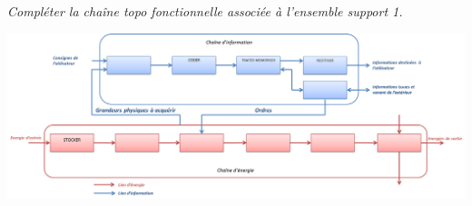 \documentclass[10pt]{article}
\begin{document}
\subparagraph{}
\textit{Compléter la chaîne topo fonctionnelle associée à l’ensemble support 1.}

\ifprof
\begin{corrige}
\begin{center}
\end{center}
\end{corrige}
\else
\begin{center}
\includegraphics[width=\textwidth]{images/cice}
\end{center}
\fi
\end{document}
